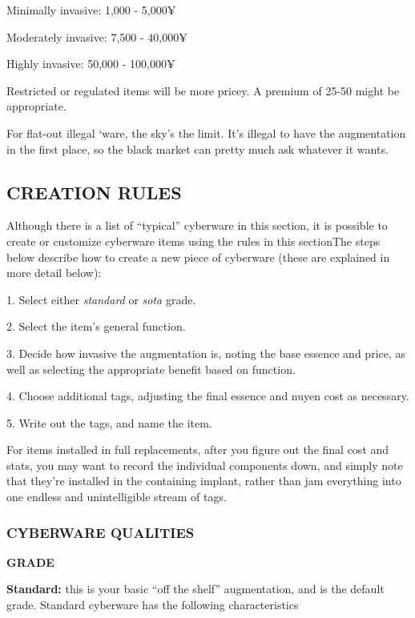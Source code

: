 \documentclass[oneside,10pt]{article}
\begin{document}
\begin{multicols}{2}
\begin{dent}


\tcirc{} Minimally invasive: 1,000 - 5,000¥

\tcirc{} Moderately invasive: 7,500 - 40,000¥

\tcirc{} Highly invasive: 50,000 - 100,000¥
\end{dent}
Restricted or regulated items will be more pricey. A premium
of 25-50%
might be appropriate.

For flat-out illegal ‘ware, the sky’s the limit. It’s illegal to have
the augmentation in the first place, so the black market can
pretty much ask whatever it wants.

\subsection{CREATION RULES}
Although there is a list of ``typical'' cyberware in this section,
it is possible to create or customize cyberware items using
the rules in this sectionThe steps below describe how to create a new piece of cyberware (these are explained in more
detail below):

\begin{dent}


1.	Select either \textit{standard} or \textit{sota} grade.

2.	Select the item’s general function.

3.	Decide how invasive the augmentation is, noting the
base essence and price, as well as selecting the appropriate benefit based on function.

4.	Choose additional tags, adjusting the final essence and
nuyen cost as necessary.

5.	Write out the tags, and name the item.
\end{dent}
For items installed in full replacements, after you figure out
the final cost and stats, you may want to record the individual
components down, and simply note that they’re installed in
the containing implant, rather than jam everything into one
endless and unintelligible stream of tags.

\subsubsection{CYBERWARE QUALITIES}

\textbf{\large GRADE}

\textbf{Standard:} this is your basic ``off the shelf'' augmentation,
and is the default grade. Standard cyberware has the following characteristics
\begin{dent}


\end{dent}
\end{multicols}
\end{document}

